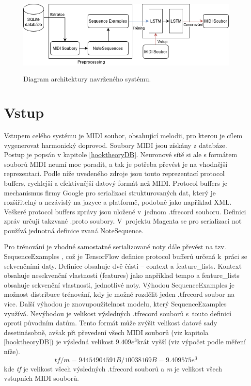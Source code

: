 \begin{figure}[h]\centering
    \centering
    \includegraphics[width=1\linewidth]{obrazky/SystemArchitecture.png}\\[1pt]  
    \caption{Diagram architektury navrženého systému.}    
    \label{obrazekArchitekturaSystemu}
\end{figure}

\section{Vstup}
Vstupem celého systému je MIDI soubor, obsahující melodii,
pro kterou je cílem vygenerovat harmonický doprovod.
Soubory MIDI jsou získány z databáze.
Postup je popsán v kapitole \ref{hooktheoryDB}.
Neuronové sítě si ale s formátem souborů MIDI neumí moc poradit,
a tak je potřeba převést je na vhodnější reprezentaci.
Podle níže uvedeného zdroje \cite{google_git_polyphony} 
jsou touto reprezentací protocol buffers,
rychlejší a efektivnější datový formát než MIDI.
Protocol buffers je mechanismus firmy Google pro serializaci strukturovaných dat,
který je rozšiřitelný a nezávislý na jazyce a platformě, podobně jako například XML.
Veškeré protocol buffers zprávy jsou uložené v~jednom .tfrecord souboru.
Definici zpráv určují takzvané .proto soubory.\cite{google_ProtocolBuffers}
V~projektu Magenta se pro serializaci not používá jednotná definice zvaná NoteSequence.
\cite{google_musicColab}
\par

Pro trénování je vhodné samostatné serializované noty dále převést na tzv. SequenceExamples
\cite{google_git_polyphony},
což je TensorFlow definice protocol bufferů určená k~práci se sekvenčními daty.
Definice obsahuje dvě části -- context a feature\_lists.
Kontext obsahuje nesekvenční vlastnosti (features) jako například tempo a 
feature\_lists obsahuje sekvenční vlastnosti, jednotlivé noty.
Výhodou SequenceExamples je možnost distribuce trénování, 
kdy je možné rozdělit jeden .tfrecord soubor na více.
Další výhodou je znovupoužitelnost modelu, který SequenceExamples využívá.
Nevýhodou je velikost výsledných .tfrecord souborů s~touto definicí oproti původním datům. 
\cite{britz_undocumentedFeatures}
Tento formát může zvýšit velikost datové sady desetinásobně,
avšak při převedení všech MIDI souborů (viz kapitola \ref{hooktheoryDB}) 
je výsledná velikost $9.409e^3$krát vyšší (viz výpočet podle měření níže).
\begin{equation}
     tf / m = 94454904591B / 10038169B = 9.409575e^3
\end{equation}
kde \emph{tf} je velikost všech výsledných .tfrecord souborů 
a \emph{m} je velikost všech vstupních MIDI souborů.

